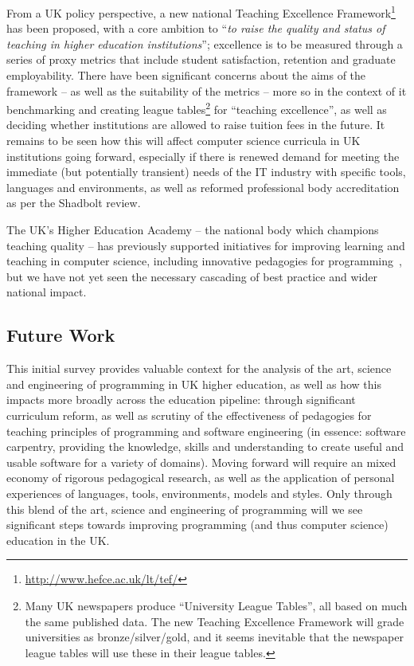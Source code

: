 \documentclass[english,submission]{programming}
\begin{document}
From a UK policy perspective, a new national Teaching Excellence
Framework\footnote{\url{http://www.hefce.ac.uk/lt/tef/}} has been
proposed, with a core ambition to ``{\emph{to raise the quality and
status of teaching in higher education institutions}}''; excellence is
to be measured through a series of proxy metrics that include student
satisfaction, retention and graduate employability. There have been
significant concerns about the aims of the framework -- as well as the
suitability of the metrics -- more so in the context of it
benchmarking and creating league tables\footnote{Many UK newspapers produce ``University League Tables'', all based on much the same published data. The new Teaching Excellence Framework will grade universities as bronze/silver/gold, and it seems inevitable that the newspaper league tables will use these in their league tables.} for ``teaching excellence'',
as well as deciding whether institutions are allowed to raise tuition
fees in the future. It remains to be seen how this will affect
computer science curricula in UK institutions going forward,
especially if there is renewed demand for meeting the immediate (but
potentially transient) needs of the IT industry with specific tools,
languages and environments, as well as reformed professional body
accreditation as per the Shadbolt review.

The UK's Higher Education Academy -- the national body which champions
teaching quality -- has previously supported initiatives for improving
learning and teaching in computer science, including innovative
pedagogies for
programming~\cite{crick-et-al-hea:2015,davenport-et-al:latice2016},
but we have not yet seen the necessary cascading of best practice and
wider national impact.

\subsection{Future Work}

This initial survey provides valuable context for the analysis of the
art, science and engineering of programming in UK higher education, as
well as how this impacts more broadly across the education pipeline:
through significant curriculum reform, as well as scrutiny of the
effectiveness of pedagogies for teaching principles of programming and
software engineering (in essence: software carpentry, providing the
knowledge, skills and understanding to create useful and usable
software for a variety of domains). Moving forward will require an
mixed economy of rigorous pedagogical research, as well as the
application of personal experiences of languages, tools, environments,
models and styles. Only through this blend of the art, science and
engineering of programming will we see significant steps towards
improving programming (and thus computer science) education in the UK.
\end{document}
